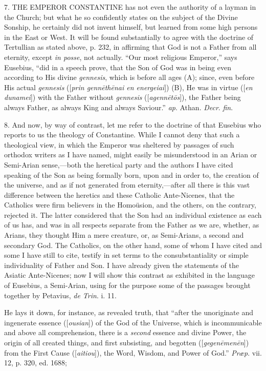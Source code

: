 7. THE EMPEROR CONSTANTINE
has not even the authority of a layman in the Church; but what he so
confidently states on the subject of the Divine Sonship, he certainly
did not invent himself, but learned from some high persons in the East
or West. It will be found substantially to agree with the doctrine of
Tertullian as stated above, p. 232, in affirming that God is not a
Father from all eternity, except \emph{in posse}, not actually.
``Our most religious Emperor,'' says Eusebius, ``did in a
speech prove, that the Son of God was in being even according to His
divine \emph{gennesis}, which is before all ages (A); since, even
before His actual \emph{gennesis} ([\emph{prin genn\={e}th\={e}nai
en energeiai}]) (B), He was in virtue ([\emph{en dunamei}]) with
the Father without \emph{gennesis} ([\emph{agenn\={e}t\={o}s}]),
the Father being always Father, as always King and always Saviour.''
\emph{ap}. Athan. \emph{Decr}. \emph{fin}.

8. And now, by way of contrast, let me refer to the doctrine of
that Eusebius who reports to us the theology of Constantine. While I
cannot deny that such a theological view, in which the Emperor was
sheltered by passages of such orthodox writers as I have named, might
easily be misunderstood in an Arian or Semi-Arian sense,—both the
heretical party and the authors I have cited speaking of the Son as
being formally born, upon and in order to, the creation of the
universe, and as if not generated from eternity,—after all there is
this vast difference between the heretics and these Catholic Ante-Nicenes,
that the Catholics were firm believers in the Homoüsion, and the
others, on the contrary, rejected it. The latter considered that the
Son had an individual existence as each of us has, and was in all
respects separate from the Father as we are, whether, as Arians, they
thought Him a mere creature, or, as Semi-Arians, a second and
secondary God. The Catholics, on the other hand, some of whom I have
cited and some I have still to cite, testify in set terms to the
consubstantiality or simple individuality of Father and Son. I have
already given the statements of the Asiatic Ante-Nicenes; now I will
show this contrast as exhibited in the language of Eusebius, a
Semi-Arian, using for the purpose some of the passages brought
together by Petavius, \emph{de Trin}. i. 11.

He lays it down, for instance, as revealed truth, that ``after
the unoriginate and ingenerate essence ([\emph{ousian}]) of the God of
the Universe, which is incommunicable and above all comprehension,
there is a \emph{second} essence and divine Power, the origin of all
created things, and first subsisting, and begotten ([\emph{gegen\={e}men\={e}n}])
from the First Cause ([\emph{aitiou}]), the Word, Wisdom, and Power of
God.'' \emph{Præp}. vii. 12, p. 320, ed. 1688;

